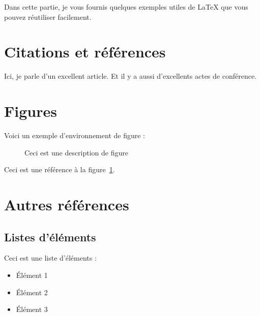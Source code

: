 Dans cette partie, je vous fournis quelques exemples utiles de \LaTeX{} que vous pouvez réutiliser facilement.

\section{Citations et références}\label{sec:citations-and-references}

Ici, je parle d'un excellent article\cite{imaginary_proceedings}. Et il y a aussi d'excellents actes de conférence\cite{imaginary_article}.

\section{Figures}\label{sec:figures}

Voici un exemple d'environnement de figure :

\begin{figure}[H]
    \centering
    \caption{Ceci est une description de figure}
    \label{fig:figure-example}
\end{figure}

Ceci est une référence à la figure~\ref{fig:figure-example}.

\section{Autres références}\label{sec:other-references}

\subsection{Listes d'éléments}\label{subsec:item-lists}

Ceci est une liste d'éléments :

\begin{itemize}
    \item Élément 1
    \item Élément 2
    \item Élément 3
\end{itemize}

